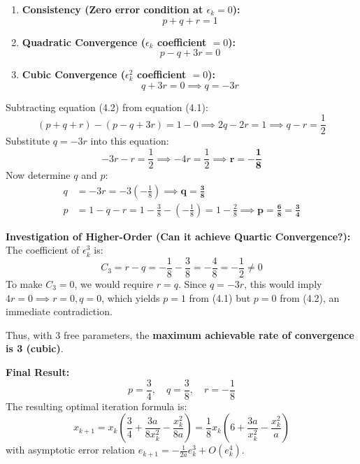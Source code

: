 \documentclass[11pt,a4paper]{article}
\numberwithin{equation}{section}
\begin{document}
\begin{solbox}
\begin{enumerate}[leftmargin=2em]
    \item \textbf{Consistency (Zero error condition at $\epsilon_k = 0$):}
    \begin{equation}
        p + q + r = 1 \tag{4.1}
    \end{equation}
    \item \textbf{Quadratic Convergence ($\epsilon_k$ coefficient $= 0$):}
    \begin{equation}
        p - q + 3r = 0 \tag{4.2}
    \end{equation}
    \item \textbf{Cubic Convergence ($\epsilon_k^2$ coefficient $= 0$):}
    \begin{equation}
        q + 3r = 0 \implies q = -3r \tag{4.3}
    \end{equation}
\end{enumerate}
Subtracting equation (4.2) from equation (4.1):
\begin{equation}
    (p + q + r) - (p - q + 3r) = 1 - 0 \implies 2q - 2r = 1 \implies q - r = \frac{1}{2}
\end{equation}
Substitute $q = -3r$ into this equation:
\begin{equation}
    -3r - r = \frac{1}{2} \implies -4r = \frac{1}{2} \implies \mathbf{r = -\frac{1}{8}}
\end{equation}
Now determine $q$ and $p$:
\begin{align}
    q &= -3r = -3\left(-\frac{1}{8}\right) \implies \mathbf{q = \frac{3}{8}} \\
    p &= 1 - q - r = 1 - \frac{3}{8} - \left(-\frac{1}{8}\right) = 1 - \frac{2}{8} \implies \mathbf{p = \frac{6}{8} = \frac{3}{4}}
\end{align}

\noindent\textbf{Investigation of Higher-Order (Can it achieve Quartic Convergence?):}
The coefficient of $\epsilon_k^3$ is:
\begin{equation}
    C_3 = r - q = -\frac{1}{8} - \frac{3}{8} = -\frac{4}{8} = -\frac{1}{2} \ne 0
\end{equation}
To make $C_3 = 0$, we would require $r = q$. Since $q = -3r$, this would imply $4r = 0 \implies r = 0, q = 0$, which yields $p = 1$ from (4.1) but $p = 0$ from (4.2), an immediate contradiction. 

Thus, with 3 free parameters, the \textbf{maximum achievable rate of convergence is 3 (cubic)}.

\vspace{0.2cm}
\noindent\textbf{Final Result:}
\begin{equation}
    \boxed{p = \frac{3}{4}, \quad q = \frac{3}{8}, \quad r = -\frac{1}{8}}
\end{equation}
The resulting optimal iteration formula is:
\begin{equation}
    x_{k+1} = x_k \left( \frac{3}{4} + \frac{3a}{8x_k^2} - \frac{x_k^2}{8a} \right) = \frac{1}{8} x_k \left( 6 + \frac{3a}{x_k^2} - \frac{x_k^2}{a} \right)
\end{equation}
with asymptotic error relation $e_{k+1} = -\frac{1}{2a} e_k^3 + O(e_k^4)$.
\end{solbox}
\end{document}
